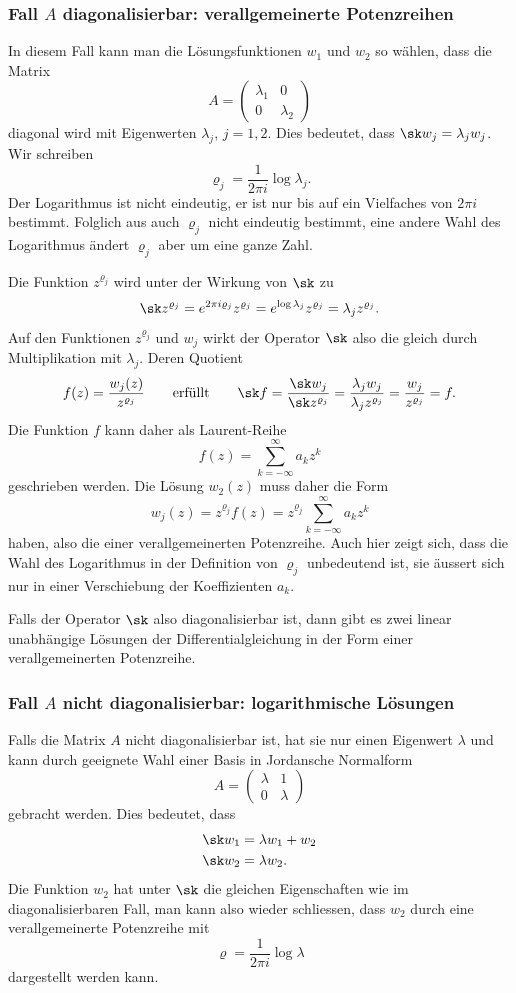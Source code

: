 \subsubsection{Fall $A$ diagonalisierbar: verallgemeinerte Potenzreihen}
In diesem Fall kann man die Lösungsfunktionen $w_1$ und $w_2$ so
wählen, dass die Matrix
\[
A=\begin{pmatrix}\lambda_1&0\\0&\lambda_2\end{pmatrix}
\]
diagonal wird mit Eigenwerten $\lambda_j$, $j=1,2$.
Dies bedeutet, dass $\sk w_j = \lambda_j w_j$.
Wir schreiben
\[
\varrho_j = \frac{1}{2\pi i} \log\lambda_j.
\]
Der Logarithmus ist nicht eindeutig, er ist nur bis auf ein Vielfaches
von $2\pi i$ bestimmt.
Folglich aus auch $\varrho_j$ nicht eindeutig bestimmt, eine
andere Wahl des Logarithmus ändert $\varrho_j$ aber um eine ganze Zahl.

Die Funktion $z^{\varrho_j}$ wird unter der Wirkung von $\sk$ zu
\[
\sk z^{\varrho_j}
=
e^{2\pi i\varrho_j} z^{\varrho_j}
=
e^{\log \lambda_j} z^{\varrho_j}
=
\lambda_j z^{\varrho_j}.
\]
Auf den Funktionen $z^{\varrho_j}$ und $w_j$ wirkt der Operator $\sk$
also die gleich durch Multiplikation mit $\lambda_j$.
Deren Quotient
\[
f(z) = \frac{w_j(z)}{z^{\varrho_j}}
\qquad\text{erfüllt}\qquad
\sk f
=
\frac{\sk w_j}{\sk z^{\varrho_j}}
=
\frac{\lambda_j w_j}{\lambda_j z^{\varrho_j}}
=
\frac{w_j}{z^{\varrho_j}}
=
f.
\]
Die Funktion $f$ kann daher als Laurent-Reihe
\[
f(z) 
=
\sum_{k=-\infty}^\infty a_kz^k
\]
geschrieben werden.
Die Lösung $w_2(z)$ muss daher die Form
\begin{equation}
w_j(z)
=
z^{\varrho_j} f(z)
=
z^{\varrho_j} \sum_{k=-\infty}^\infty a_kz^k
\end{equation}
haben, also die einer verallgemeinerten Potenzreihe.
Auch hier zeigt sich, dass die Wahl des Logarithmus in der Definition
von $\varrho_j$ unbedeutend ist, sie äussert sich nur in einer
Verschiebung der Koeffizienten $a_k$.

Falls der Operator $\sk$ also diagonalisierbar ist, dann gibt es
zwei linear unabhängige Lösungen der Differentialgleichung in der
Form einer verallgemeinerten Potenzreihe.

\subsubsection{Fall $A$ nicht diagonalisierbar: logarithmische Lösungen}
Falls die Matrix $A$ nicht diagonalisierbar ist, hat sie nur einen
Eigenwert $\lambda$ und kann durch geeignete Wahl einer Basis in
Jordansche Normalform
\[
A
=
\begin{pmatrix}
\lambda &    1    \\
   0    & \lambda
\end{pmatrix}
\]
gebracht werden.
Dies bedeutet, dass
\begin{align*}
\sk w_1 &= \lambda w_1 + w_2
\\
\sk w_2 &= \lambda w_2.
\end{align*}
Die Funktion $w_2$ hat unter $\sk$ die gleichen Eigenschaften
wie im diagonalisierbaren Fall, man kann also wieder schliessen,
dass $w_2$ durch eine verallgemeinerte Potenzreihe mit
\[
\varrho=\frac{1}{2\pi i} \log \lambda
\]
dargestellt werden kann.

